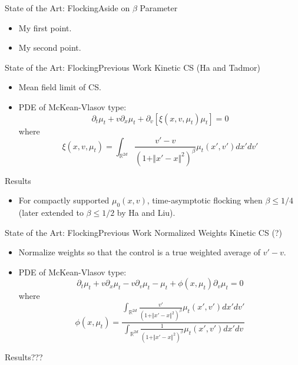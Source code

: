 \documentclass{beamer}
\begin{document}
\begin{frame}{State of the Art: Flocking}{Aside on $\beta$ Parameter}
	\begin{itemize}
		\item {
			My first point.
		}
		\item {
			My second point.
		}
	\end{itemize}
\end{frame}

\begin{frame}{State of the Art: Flocking}{Previous Work}
	Kinetic CS (Ha and Tadmor)
	\begin{itemize}
		\item {
			Mean field limit of CS.
		}
		\item {
			PDE of McKean-Vlasov type:
		}
		\begin{equation}
		\partial_t \mu_t+v \partial_x \mu_t+\partial_v \left[\xi (x,v,\mu_t) \mu_t \right]=0
		\end{equation}
		where
		\begin{equation}
		\xi (x,v,\mu_t)=\int_{\mathbb{R}^{2d}} \frac{v'-v}{(1+\Vert x'-x \Vert^2)^\beta}\mu_t(x',v')dx'dv'
		\end{equation}
	\end{itemize}
	Results
	\begin{itemize}
		\item For compactly supported $\mu_0(x,v)$, time-asymptotic flocking when $\beta \leq 1/4$ (later extended to $\beta \leq 1/2$ by Ha and Liu).
	\end{itemize}
\end{frame}

\begin{frame}{State of the Art: Flocking}{Previous Work}
	Normalized Weights Kinetic CS (?)
	\begin{itemize}
		\item {
			Normalize weights so that the control is a true weighted average of $v'-v$.
		}
		\item {
			PDE of McKean-Vlasov type:
		}
		\begin{equation}
		\partial_t \mu_t+v \partial_x \mu_t-v \partial_v \mu_t-\mu_t+\phi (x,\mu_t)\partial_v \mu_t=0
		\end{equation}
		where
		\begin{equation}
		\phi (x,\mu_t)=\frac{\int_{\mathbb{R}^{2d}} \frac{v'}{(1+\Vert x'-x \Vert^2)^\beta}\mu_t(x',v')dx'dv'}{\int_{\mathbb{R}^{2d}} \frac{1}{(1+\Vert x'-x \Vert^2)^\beta}\mu_t(x',v')dx'dv}
		\end{equation}
	\end{itemize}
	Results???
\end{frame}
\end{document}
